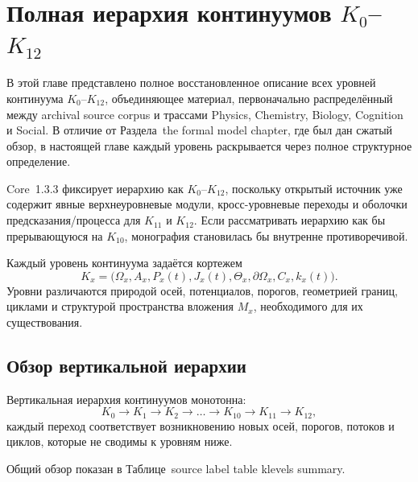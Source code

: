 
\section{Полная иерархия континуумов \texorpdfstring{\texorpdfstring{$K_0$}{K\_0}–$K_{12}$}{K0–K12}}
\label{sec:klevels-full}

В этой главе представлено полное восстановленное описание всех уровней
континуума \(K_0\)–\(K_{12}\), объединяющее материал, первоначально
распределённый между archival source corpus и трассами Physics, Chemistry, Biology, Cognition
и Social.
В отличие от Раздела~the formal model chapter, где был дан сжатый обзор,
в настоящей главе каждый уровень раскрывается через полное структурное
определение.

Core~1.3.3 фиксирует иерархию как \(K_0\)–\(K_{12}\), поскольку открытый
источник уже содержит явные верхнеуровневые модули, кросс-уровневые переходы
и оболочки предсказания/процесса для \(K_{11}\) и \(K_{12}\).
Если рассматривать иерархию как бы прерывающуюся на \(K_{10}\),
монография становилась бы внутренне противоречивой.

Каждый уровень континуума задаётся кортежем
\[
    K_x = \big(\Omega_x, A_x, P_x(t), J_x(t), \Theta_x,
           \partial\Omega_x, C_x, k_x(t)\big).
\]
Уровни различаются природой осей, потенциалов, порогов,
геометрией границ, циклами и структурой пространства вложения
\(M_x\), необходимого для их существования.


\subsection{Обзор вертикальной иерархии}

Вертикальная иерархия континуумов монотонна:
\[
    K_0 \rightarrow K_1 \rightarrow K_2 \rightarrow \dots
    \rightarrow K_{10} \rightarrow K_{11} \rightarrow K_{12},
\]
каждый переход соответствует возникновению новых осей,
порогов, потоков и циклов, которые не сводимы к уровням ниже.

Общий обзор показан в Таблице~source label table klevels summary.

